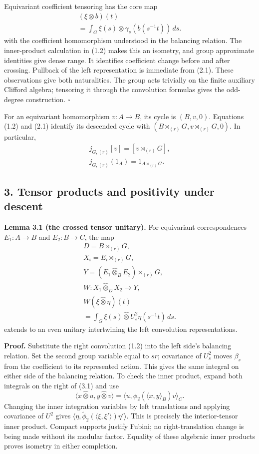 \documentclass[
  11pt,
]{article}
\begin{document}
Equivariant coefficient tensoring has the core map \[
\begin{gathered}
(\xi\otimes b)(t)\\
=\int_G\xi(s)\otimes\gamma_s(b(s^{-1}t))\,ds.
\end{gathered}
\tag{2.5}
\] with the coefficient homomorphism understood in the balancing
relation. The inner-product calculation in (1.2) makes this an isometry,
and group approximate identities give dense range. It identifies
coefficient change before and after crossing. Pullback of the left
representation is immediate from (2.1). These observations give both
naturalities. The group acts trivially on the finite auxiliary Clifford
algebra; tensoring it through the convolution formulas gives the
odd-degree construction. \(\square\)

For an equivariant homomorphism \(v:A\to B\), its cycle is \((B,v,0)\).
Equations (1.2) and (2.1) identify its descended cycle with
\((B\rtimes_{(r)}G,v\rtimes_{(r)}G,0)\). In particular, \[
\begin{gathered}
j_{G,(r)}[v]=[v\rtimes_{(r)}G],\\
j_{G,(r)}(1_A)=1_{A\rtimes_{(r)}G}.
\end{gathered}
\tag{2.6}
\]

\subsection{3. Tensor products and positivity under
descent}\label{tensor-products-and-positivity-under-descent}

\textbf{Lemma 3.1 (the crossed tensor unitary).} For equivariant
correspondences \(E_1:A\to B\) and \(E_2:B\to C\), the map \[
\begin{gathered}
D=B\rtimes_{(r)}G,\\
X_i=E_i\rtimes_{(r)}G,\\
Y=(E_1\widehat\otimes_BE_2)\rtimes_{(r)}G,\\
W:X_1\widehat\otimes_DX_2\longrightarrow Y,\\
W(\xi\widehat\otimes\eta)(t)\\
=\int_G\xi(s)\widehat\otimes U_s^2\eta(s^{-1}t)\,ds.
\end{gathered}
\tag{3.1}
\] extends to an even unitary intertwining the left convolution
representations.

\textbf{Proof.} Substitute the right convolution (1.2) into the left
side's balancing relation. Set the second group variable equal to
\(sr\); covariance of \(U_s^2\) moves \(\beta_s\) from the coefficient
to its represented action. This gives the same integral on either side
of the balancing relation. To check the inner product, expand both
integrals on the right of (3.1) and use \[
\langle x\widehat\otimes u,y\widehat\otimes v\rangle
 =\langle u,\phi_2(\langle x,y\rangle_B)v\rangle_C.
\tag{3.2}
\] Changing the inner integration variables by left translations and
applying covariance of \(U^2\) gives
\(\langle\eta,\widetilde\phi_2(\langle\xi,\xi'\rangle)\eta'\rangle\).
This is precisely the interior-tensor inner product. Compact supports
justify Fubini; no right-translation change is being made without its
modular factor. Equality of these algebraic inner products proves
isometry in either completion.
\end{document}
